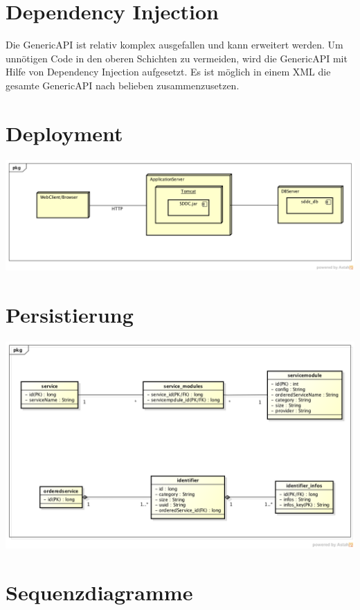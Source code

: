 \section{Dependency Injection}

Die GenericAPI ist relativ komplex ausgefallen und kann erweitert werden. Um unnötigen Code in den oberen Schichten zu vermeiden, wird die GenericAPI mit Hilfe von Dependency Injection aufgesetzt. Es ist möglich in einem XML die gesamte GenericAPI nach belieben zusammenzusetzen.

\section{Deployment}

\includegraphics[width=\textwidth]{./05_Design/04_Architektur/deployment}

\section{Persistierung}

\includegraphics[width=\textwidth]{./05_Design/04_Architektur/Datenmodell}

\section{Sequenzdiagramme}
